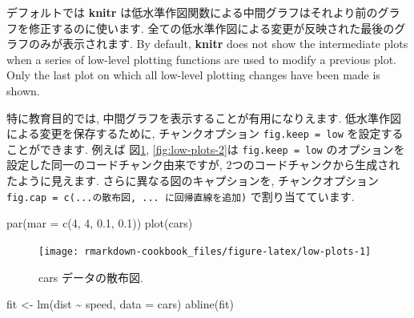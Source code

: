 \documentclass[
  11pt,
]{bxjsreport}
\newenvironment{Shaded}{\begin{snugshade}}{\end{snugshade}}
\newcommand{\AttributeTok}[1]{\textcolor[rgb]{0.77,0.63,0.00}{#1}}
\newcommand{\DecValTok}[1]{\textcolor[rgb]{0.00,0.00,0.81}{#1}}
\newcommand{\FloatTok}[1]{\textcolor[rgb]{0.00,0.00,0.81}{#1}}
\newcommand{\FunctionTok}[1]{\textcolor[rgb]{0.00,0.00,0.00}{#1}}
\newcommand{\NormalTok}[1]{#1}
\newcommand{\OtherTok}[1]{\textcolor[rgb]{0.56,0.35,0.01}{#1}}
\newcommand{\SpecialCharTok}[1]{\textcolor[rgb]{0.00,0.00,0.00}{#1}}
\begin{document}
デフォルトでは \textbf{knitr} は低水準作図関数による中間グラフはそれより前のグラフを修正するのに使います. 全ての低水準作図による変更が反映された最後のグラフのみが表示されます. By default, \textbf{knitr} does not show the intermediate plots when a series of low-level plotting functions are used to modify a previous plot. Only the last plot on which all low-level plotting changes have been made is shown.

特に教育目的では, 中間グラフを表示することが有用になりえます. 低水準作図による変更を保存するために, チャンクオプション \texttt{fig.keep = \textquotesingle{}low\textquotesingle{}} を設定することができます. 例えば 図\ref{fig:low-plots-1}, \ref{fig:low-plots-2}は \texttt{fig.keep = \textquotesingle{}low\textquotesingle{}} のオプションを設定した同一のコードチャンク由来ですが, 2つのコードチャンクから生成されたように見えます. さらに異なる図のキャプションを, チャンクオプション \texttt{fig.cap = c(\textquotesingle{}...の散布図\textquotesingle{},\ \textquotesingle{}...\ に回帰直線を追加\textquotesingle{})} で割り当てています.

\begin{Shaded}
\begin{Highlighting}[numbers=left,,]
\FunctionTok{par}\NormalTok{(}\AttributeTok{mar =} \FunctionTok{c}\NormalTok{(}\DecValTok{4}\NormalTok{, }\DecValTok{4}\NormalTok{, }\FloatTok{0.1}\NormalTok{, }\FloatTok{0.1}\NormalTok{))}
\FunctionTok{plot}\NormalTok{(cars)}
\end{Highlighting}
\end{Shaded}

\begin{figure}

{\centering \texttt{[image: rmarkdown-cookbook\_files/figure-latex/low-plots-1]} 

}

\caption{cars データの散布図.}\label{fig:low-plots-1}
\end{figure}

\begin{Shaded}
\begin{Highlighting}[numbers=left,,]
\NormalTok{fit }\OtherTok{\textless{}{-}} \FunctionTok{lm}\NormalTok{(dist }\SpecialCharTok{\textasciitilde{}}\NormalTok{ speed, }\AttributeTok{data =}\NormalTok{ cars)}
\FunctionTok{abline}\NormalTok{(fit)}
\end{Highlighting}
\end{Shaded}
\end{document}
